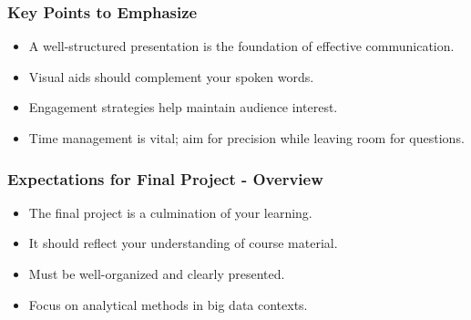 \documentclass[aspectratio=169]{beamer}
\begin{document}
\begin{frame}[fragile]
    \frametitle{Key Points to Emphasize}
    \begin{itemize}
        \item A well-structured presentation is the foundation of effective communication.
        \item Visual aids should complement your spoken words.
        \item Engagement strategies help maintain audience interest.
        \item Time management is vital; aim for precision while leaving room for questions.
    \end{itemize}
\end{frame}

\begin{frame}
    \frametitle{Expectations for Final Project - Overview}
    \begin{itemize}
        \item The final project is a culmination of your learning.
        \item It should reflect your understanding of course material.
        \item Must be well-organized and clearly presented.
        \item Focus on analytical methods in big data contexts.
    \end{itemize}
\end{frame}
\end{document}
